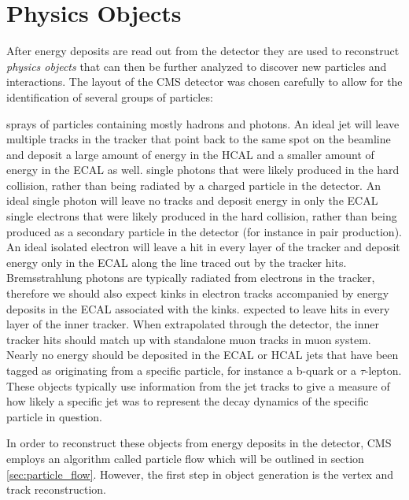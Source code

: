 \section{Physics Objects}
  After energy deposits are read out from the detector they are used to reconstruct \emph{physics objects} that can then be further analyzed to discover new particles and interactions. The layout of the CMS detector was chosen carefully to allow for the identification of several groups of particles:

  \begin{enumerate}
     sprays of particles containing mostly hadrons and photons. An ideal jet will leave multiple tracks in the tracker that point back to the same spot on the beamline and deposit a large amount of energy in the HCAL and a smaller amount of energy in the ECAL as well.
     single photons that were likely produced in the hard collision, rather than being radiated by a charged particle in the detector. An ideal single photon will leave no tracks and deposit energy in only the ECAL
     single electrons that were likely produced in the hard collision, rather than being produced as a secondary particle in the detector (for instance in pair production). An ideal isolated electron will leave a hit in every layer of the tracker and deposit energy only in the ECAL along the line traced out by the tracker hits. Bremsstrahlung photons are typically radiated from electrons in the tracker, therefore we should also expect kinks in electron tracks accompanied by energy deposits in the ECAL associated with the kinks.
     expected to leave hits in every layer of the inner tracker. When extrapolated through the detector, the inner tracker hits should match up with standalone muon tracks in muon system. Nearly no energy should be deposited in the ECAL or HCAL
     jets that have been tagged as originating from a specific particle, for instance a b-quark or a $\tau$-lepton. These objects typically use information from the jet tracks to give a measure of how likely a specific jet was to represent the decay dynamics of the specific particle in question.
  \end{enumerate}

  In order to reconstruct these objects from energy deposits in the detector, CMS employs an algorithm called particle flow\cite{cms_particleflow} which will be outlined in section \ref{sec:particle_flow}. However, the first step in object generation is the vertex and track reconstruction.


